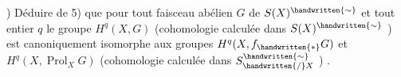 ) Déduire de 5) que pour tout faisceau abélien \(G\)  de \(S(X)^{\handwritten{\sim}}\) et tout entier \(q\) le groupe \(H^q(X,G)\)  (cohomologie calculée dans \(S(X)^{\handwritten{\sim}}\) ) est canoniquement isomorphe aux groupes \(H^q(X,f_{\handwritten{*}}G)\) et \(H^q(X,\operatorname{Prol}_X G)\) (cohomologie calculée dans \(S^{\handwritten{\sim}}_{\handwritten{/}X}\) ) .
